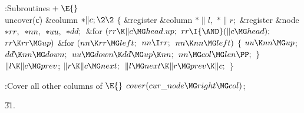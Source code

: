 \Y\B\4:Subroutines\X${}\mathrel+\E{}$\6
\\{uncover}(\|c)\1\1\6
\&{column} ${}{*}\|c;\2\2{}$\6
${}\{{}$\5
\1\&{register} \&{column} ${}{*}\|l,{}$ ${}{*}\|r;{}$\6
\&{register} \&{node} ${}{*}\\{rr},{}$ ${}{*}\\{nn},{}$ ${}{*}\\{uu},{}$ ${}{*}%
\\{dd};{}$\7
\&{for} ${}(\\{rr}\K\|c\MG\\{head}.\\{up};{}$ ${}\\{rr}\I{\AND}(\|c\MG%
\\{head});{}$ ${}\\{rr}\K\\{rr}\MG\\{up}){}$\1\6
\&{for} ${}(\\{nn}\K\\{rr}\MG\\{left};{}$ ${}\\{nn}\I\\{rr};{}$ ${}\\{nn}\K%
\\{nn}\MG\\{left}){}$\5
${}\{{}$\1\6
${}\\{uu}\K\\{nn}\MG\\{up}{}$;\5
${}\\{dd}\K\\{nn}\MG\\{down};{}$\6
${}\\{uu}\MG\\{down}\K\\{dd}\MG\\{up}\K\\{nn};{}$\6
${}\\{nn}\MG\\{col}\MG\\{len}\PP;{}$\6
\4${}\}{}$\2\2\6
${}\|l\K\|c\MG\\{prev}{}$;\5
${}\|r\K\|c\MG\\{next};{}$\6
${}\|l\MG\\{next}\K\|r\MG\\{prev}\K\|c;{}$\6
\4${}\}{}$\2\par
\fi

\B{}:Cover all other columns of %
\X${}\E{}$\6
$\\{cover}(\\{cur\_node}\MG\\{right}\MG\\{col}){}$;\par
\U31.\fi

